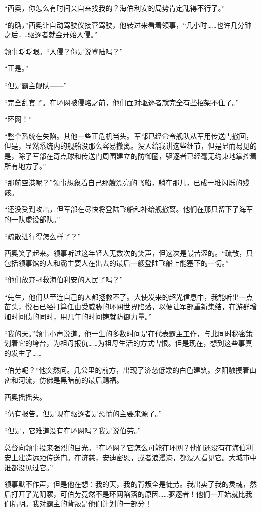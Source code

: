\documentclass[AutoFakeBold=true]{book}
\begin{document}
``西奥，你怎么有时间亲自来找我的？海伯利安的局势肯定乱得不行了。''

``的确，''西奥让自动驾驶仪接管驾驶，他转过来看着领事，``几小时……也许几分钟之后……驱逐者就会开始入侵。''

领事眨眨眼。``入侵？你是说登陆吗？''

``正是。''

``但是霸主舰队——''

``完全乱套了。在环网被侵略之前，他们面对驱逐者就完全有些招架不住了。''

``环网！''

``整个系统在失陷。其他一些正危机当头。军部已经命令舰队从军用传送门撤回，但是，显然系统内的舰船没那么容易撤离。没人给我讲这些细节，但是显而易见的是，除了军部在奇点球和传送门周围建立的防御圈，驱逐者已经毫无约束地掌控着所有地方了。''

``那航空港呢？''领事想象着自己那艘漂亮的飞船，躺在那儿，已成一堆闪烁的残骸。

``还没受到攻击，但军部在尽快将登陆飞船和补给舰撤离。他们在那只留下了海军的一队虚设部队。''

``疏散进行得怎么样了？''

西奥笑了起来。领事听过这年轻人无数次的笑声，但这次是最苦涩的。``疏散，只包括领事馆的人和霸主要人在出去的最后一艘登陆飞船上能塞下的一切。''

``他们放弃拯救海伯利安的人民了吗？''

``先生，他们甚至连自己的人都拯救不了。大使发来的超光信息中，我能听出一点苗头，悦石已经打算任由受威胁的环网世界陷落，以便让军部重新集结，在游群增加时间债的同时，用几年的时间铸就防御力量。''

``我的天。''领事小声说道。他一生的多数时间是在代表霸主工作，与此同时秘密策划着它的垮台，为祖母报仇……为祖母生活的方式雪恨。但是现在，想到这些事真的发生了……

``伯劳呢？''他突然问。几公里的前方，出现了济慈低矮的白色建筑。夕阳触摸着山峦和河流，仿佛是黑暗前的最后赐福。

西奥摇摇头。

``仍有报告。但是现在驱逐者是恐慌的主要来源了。''

``但是，它难道没有在环网吗？我是说伯劳。''

总督向领事投来强烈的目光。``在环网？它怎么可能在环网？他们还没有在海伯利安上建造远距传送门。在济慈，安迪密恩，或者浪漫港，都没人看见它。大城市中谁都没见过它。''

领事默不作声，但是他在想：{\kaishu 我的天，我的背叛全是徒劳。我出卖了我的灵魂，然后打开了光阴冢，可伯劳竟然不是环网陷落的原因……驱逐者！他们一开始就比我们精明。我对霸主的背叛是他们计划的一部分！}
\end{document}
